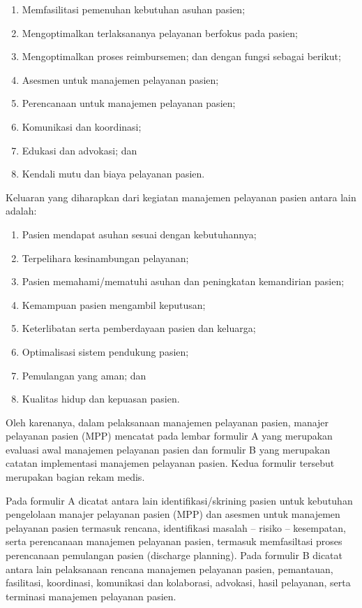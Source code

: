 \documentclass[
]{book}
\providecommand{\tightlist}{%
  \setlength{\itemsep}{0pt}\setlength{\parskip}{0pt}}
\begin{document}
\begin{enumerate}
\def\labelenumi{\alph{enumi}.}
\tightlist
\item
  Memfasilitasi pemenuhan kebutuhan asuhan pasien;
\item
  Mengoptimalkan terlaksananya pelayanan berfokus pada pasien;
\item
  Mengoptimalkan proses reimbursemen; dan dengan fungsi sebagai berikut;
\item
  Asesmen untuk manajemen pelayanan pasien;
\item
  Perencanaan untuk manajemen pelayanan pasien;
\item
  Komunikasi dan koordinasi;
\item
  Edukasi dan advokasi; dan
\item
  Kendali mutu dan biaya pelayanan pasien.
\end{enumerate}

Keluaran yang diharapkan dari kegiatan manajemen pelayanan pasien antara lain adalah:

\begin{enumerate}
\def\labelenumi{\alph{enumi}.}
\tightlist
\item
  Pasien mendapat asuhan sesuai dengan kebutuhannya;
\item
  Terpelihara kesinambungan pelayanan;
\item
  Pasien memahami/mematuhi asuhan dan peningkatan kemandirian pasien;
\item
  Kemampuan pasien mengambil keputusan;
\item
  Keterlibatan serta pemberdayaan pasien dan keluarga;
\item
  Optimalisasi sistem pendukung pasien;
\item
  Pemulangan yang aman; dan
\item
  Kualitas hidup dan kepuasan pasien.
\end{enumerate}

Oleh karenanya, dalam pelaksanaan manajemen pelayanan pasien, manajer pelayanan pasien (MPP) mencatat pada lembar formulir A yang merupakan evaluasi awal manajemen pelayanan pasien dan formulir B yang merupakan catatan implementasi manajemen pelayanan pasien. Kedua formulir tersebut merupakan bagian rekam medis.

Pada formulir A dicatat antara lain identifikasi/skrining pasien untuk kebutuhan pengelolaan manajer pelayanan pasien (MPP) dan asesmen untuk manajemen pelayanan pasien termasuk rencana, identifikasi masalah -- risiko -- kesempatan, serta perencanaan manajemen pelayanan pasien, termasuk memfasiltasi proses perencanaan pemulangan pasien (discharge planning). Pada formulir B dicatat antara lain pelaksanaan rencana manajemen pelayanan pasien, pemantauan, fasilitasi, koordinasi, komunikasi dan kolaborasi, advokasi, hasil pelayanan, serta terminasi manajemen pelayanan pasien.
\end{document}
